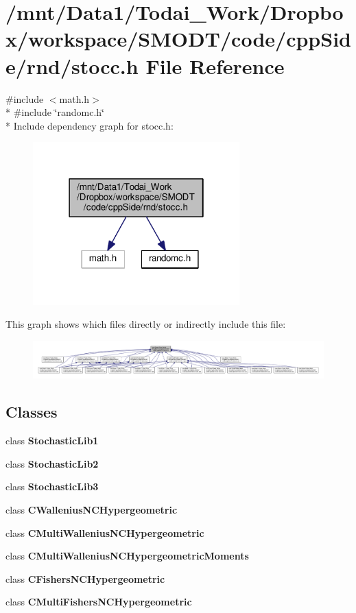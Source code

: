\section{/mnt/\-Data1/\-Todai\-\_\-\-Work/\-Dropbox/workspace/\-S\-M\-O\-D\-T/code/cpp\-Side/rnd/stocc.h File Reference}
\label{rnd_2stocc_8h}
{\ttfamily \#include $<$math.\-h$>$}\\*
{\ttfamily \#include \char`\"{}randomc.\-h\char`\"{}}\\*
Include dependency graph for stocc.\-h\-:\nopagebreak
\begin{figure}[H]
\begin{center}
\leavevmode
\includegraphics[width=226pt]{rnd_2stocc_8h__incl}
\end{center}
\end{figure}
This graph shows which files directly or indirectly include this file\-:\nopagebreak
\begin{figure}[H]
\begin{center}
\leavevmode
\includegraphics[width=350pt]{rnd_2stocc_8h__dep__incl}
\end{center}
\end{figure}
\subsection*{Classes}
\begin{DoxyCompactItemize}
\item 
class {\bf Stochastic\-Lib1}
\item 
class {\bf Stochastic\-Lib2}
\item 
class {\bf Stochastic\-Lib3}
\item 
class {\bf C\-Wallenius\-N\-C\-Hypergeometric}
\item 
class {\bf C\-Multi\-Wallenius\-N\-C\-Hypergeometric}
\item 
class {\bf C\-Multi\-Wallenius\-N\-C\-Hypergeometric\-Moments}
\item 
class {\bf C\-Fishers\-N\-C\-Hypergeometric}
\item 
class {\bf C\-Multi\-Fishers\-N\-C\-Hypergeometric}
\end{DoxyCompactItemize}
